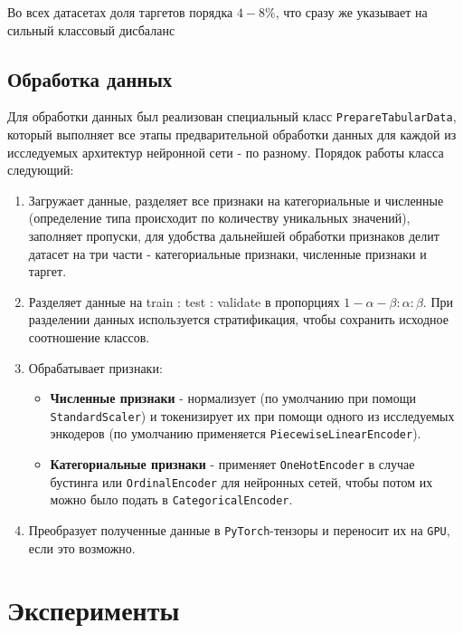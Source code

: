 \documentclass[12pt]{article}
\begin{document}
Во всех датасетах доля таргетов порядка $4-8\%$, что сразу же указывает на сильный классовый дисбаланс

\subsection{Обработка данных}

Для обработки данных был реализован специальный класс
\texttt{PrepareTabularData}, который выполняет все этапы предварительной обработки данных для каждой из исследуемых архитектур нейронной сети - по разному. Порядок работы класса следующий:

\begin{enumerate}
    \item Загружает данные, разделяет все признаки на категориальные и численные (определение типа происходит по количеству уникальных значений), заполняет пропуски, для удобства дальнейшей обработки признаков делит датасет на три части - категориальные признаки, численные признаки и таргет.
    
    \item Разделяет данные на train : test : validate в пропорциях $1-\alpha-\beta : \alpha : \beta$. При разделении данных используется стратификация, чтобы сохранить исходное соотношение классов.
    
    \item Обрабатывает признаки:
    \begin{itemize}
        \item \textbf{Численные признаки} - нормализует (по умолчанию при помощи \texttt{StandardScaler}) и токенизирует их при помощи одного из исследуемых энкодеров (по умолчанию применяется \texttt{PiecewiseLinearEncoder}).
        
        \item \textbf{Категориальные признаки} - применяет \texttt{OneHotEncoder} в случае бустинга или \texttt{OrdinalEncoder} для нейронных сетей, чтобы потом их можно было подать в \texttt{CategoricalEncoder}.
        
    \end{itemize}
    
    \item Преобразует полученные данные в \texttt{PyTorch}-тензоры и переносит их на \texttt{GPU}, если это возможно.
\end{enumerate}

\newpage
\section{Эксперименты}
\end{document}
